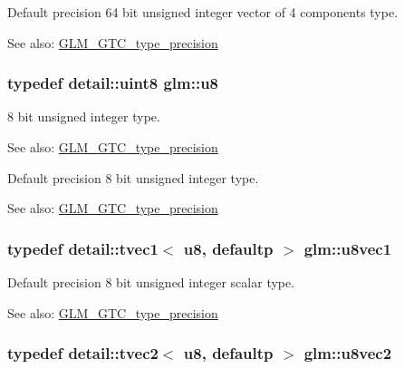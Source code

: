 Default precision 64 bit unsigned integer vector of 4 components type. \begin{Desc}
\item[See also:]\hyperlink{group__gtc__type__precision}{GLM\_\-GTC\_\-type\_\-precision} \end{Desc}
\hypertarget{group__gtc__type__precision_g5e3dc67373d5068997d2d9f41c9024d2}{
\subsubsection[u8]{\setlength{\rightskip}{0pt plus 5cm}typedef detail::uint8 {\bf glm::u8}}}
\label{group__gtc__type__precision_g5e3dc67373d5068997d2d9f41c9024d2}


8 bit unsigned integer type. \begin{Desc}
\item[See also:]\hyperlink{group__gtc__type__precision}{GLM\_\-GTC\_\-type\_\-precision}\end{Desc}
Default precision 8 bit unsigned integer type. \begin{Desc}
\item[See also:]\hyperlink{group__gtc__type__precision}{GLM\_\-GTC\_\-type\_\-precision} \end{Desc}
\hypertarget{group__gtc__type__precision_gf0155c700da11c0b5518a777d1f0cd23}{
\subsubsection[u8vec1]{\setlength{\rightskip}{0pt plus 5cm}typedef detail::tvec1$<$ u8, defaultp $>$ {\bf glm::u8vec1}}}
\label{group__gtc__type__precision_gf0155c700da11c0b5518a777d1f0cd23}


Default precision 8 bit unsigned integer scalar type. \begin{Desc}
\item[See also:]\hyperlink{group__gtc__type__precision}{GLM\_\-GTC\_\-type\_\-precision} \end{Desc}
\hypertarget{group__gtc__type__precision_ga7ea171741c23b5bb2a3c91fe8c84e8a}{
\subsubsection[u8vec2]{\setlength{\rightskip}{0pt plus 5cm}typedef detail::tvec2$<$ u8, defaultp $>$ {\bf glm::u8vec2}}}
\label{group__gtc__type__precision_ga7ea171741c23b5bb2a3c91fe8c84e8a}


